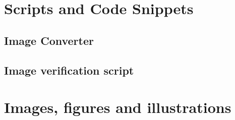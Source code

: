
%
%

\chapter{Scripts and Code Snippets}

\section{Image Converter}


\section{Image verification script}


\chapter{Images, figures and illustrations}

